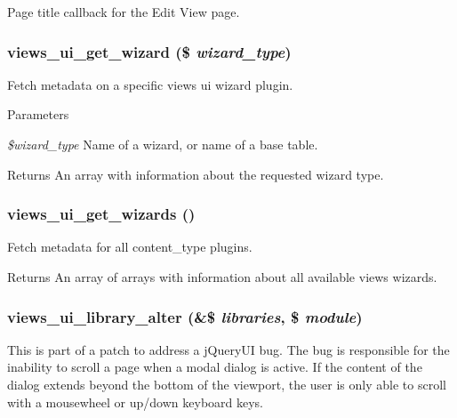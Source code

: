 \label{views__ui_8module_aac98d6c71b5ab337edf517fc59f2cddf}
Page title callback for the Edit View page. \hypertarget{views__ui_8module_ab8339e2a64a4fe940e2362faeccf38cc}{
\subsubsection[{views\_\-ui\_\-get\_\-wizard}]{\setlength{\rightskip}{0pt plus 5cm}views\_\-ui\_\-get\_\-wizard (\$ {\em wizard\_\-type})}}
\label{views__ui_8module_ab8339e2a64a4fe940e2362faeccf38cc}
Fetch metadata on a specific views ui wizard plugin.


\begin{DoxyParams}{Parameters}
\item[{\em \$wizard\_\-type}]Name of a wizard, or name of a base table.\end{DoxyParams}
\begin{DoxyReturn}{Returns}
An array with information about the requested wizard type. 
\end{DoxyReturn}
\hypertarget{views__ui_8module_af69a11591c46afd75a4e113dad9673f4}{
\subsubsection[{views\_\-ui\_\-get\_\-wizards}]{\setlength{\rightskip}{0pt plus 5cm}views\_\-ui\_\-get\_\-wizards ()}}
\label{views__ui_8module_af69a11591c46afd75a4e113dad9673f4}
Fetch metadata for all content\_\-type plugins.

\begin{DoxyReturn}{Returns}
An array of arrays with information about all available views wizards. 
\end{DoxyReturn}
\hypertarget{views__ui_8module_a8d1ae20c472021c362af79c2eb86f0f8}{
\subsubsection[{views\_\-ui\_\-library\_\-alter}]{\setlength{\rightskip}{0pt plus 5cm}views\_\-ui\_\-library\_\-alter (\&\$ {\em libraries}, \/  \$ {\em module})}}
\label{views__ui_8module_a8d1ae20c472021c362af79c2eb86f0f8}
This is part of a patch to address a jQueryUI bug. The bug is responsible for the inability to scroll a page when a modal dialog is active. If the content of the dialog extends beyond the bottom of the viewport, the user is only able to scroll with a mousewheel or up/down keyboard keys.

